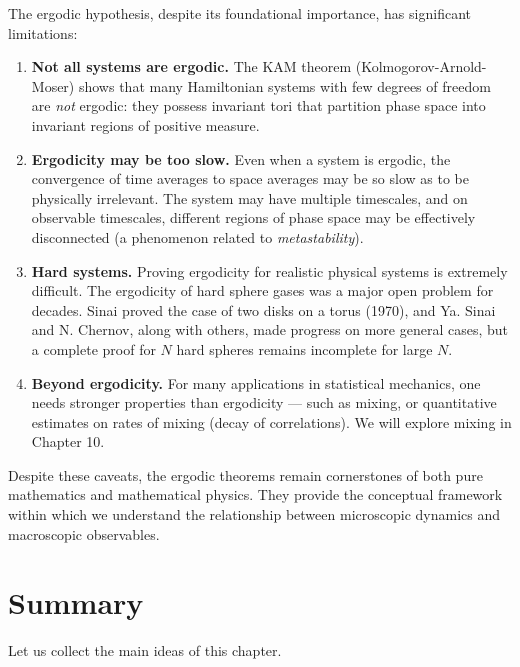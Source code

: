 The ergodic hypothesis, despite its foundational importance, has significant limitations:

\begin{enumerate}[nosep]
  \item \textbf{Not all systems are ergodic.} The KAM theorem (Kolmogorov-Arnold-Moser) shows that many Hamiltonian systems with few degrees of freedom are \textit{not} ergodic: they possess invariant tori that partition phase space into invariant regions of positive measure.

  \item \textbf{Ergodicity may be too slow.} Even when a system is ergodic, the convergence of time averages to space averages may be so slow as to be physically irrelevant. The system may have multiple timescales, and on observable timescales, different regions of phase space may be effectively disconnected (a phenomenon related to \textit{metastability}).

  \item \textbf{Hard systems.} Proving ergodicity for realistic physical systems is extremely difficult. The ergodicity of hard sphere gases was a major open problem for decades. Sinai proved the case of two disks on a torus (1970), and Ya. Sinai and N. Chernov, along with others, made progress on more general cases, but a complete proof for $N$ hard spheres remains incomplete for large $N$.

  \item \textbf{Beyond ergodicity.} For many applications in statistical mechanics, one needs stronger properties than ergodicity --- such as mixing, or quantitative estimates on rates of mixing (decay of correlations). We will explore mixing in Chapter 10.
\end{enumerate}

Despite these caveats, the ergodic theorems remain cornerstones of both pure mathematics and mathematical physics. They provide the conceptual framework within which we understand the relationship between microscopic dynamics and macroscopic observables.


\section{Summary}\label{sec:9.10}

Let us collect the main ideas of this chapter.

